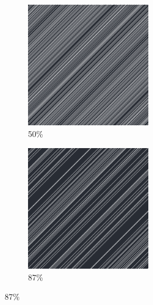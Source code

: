 \documentclass[12pt, fleqn]{report}                             %
\theoremstyle{break}                                            %
\begin{document}
\begin{figure}[ht!]
\begin{subfigure}[b]{0.4\linewidth}
          \includegraphics[width=0.6\textwidth]{Images/38/c.png}
          \caption{50\%}
        \end{subfigure}
        \begin{subfigure}[b]{0.4\linewidth}
          \includegraphics[width=0.6\textwidth]{Images/38/d.png}
          \caption{87\%}
        \end{subfigure}
      \end{figure}
\end{document}
